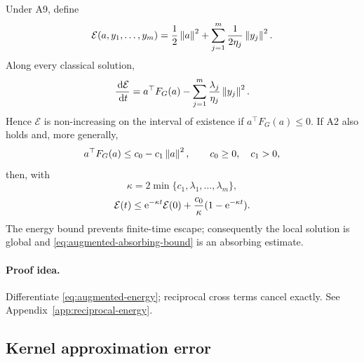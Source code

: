 \label{thm:reciprocal-energy}
\begin{theoremsix}
Under A9, define
\begin{equation}
 \mathcal E(a,y_1,\ldots,y_m)
 =\frac12\left\lVert a\right\rVert^2+
 \sum_{j=1}^{m}\frac{1}{2\eta_j}\left\lVert y_j\right\rVert^2.
 \label{eq:augmented-energy}
\end{equation}
Along every classical solution,
\begin{equation}
 \frac{\,\mathrm{d}\mathcal E}{\,\mathrm{d} t}
 =a^\top F_G(a)
 -\sum_{j=1}^{m}\frac{\lambda_j}{\eta_j}\left\lVert y_j\right\rVert^2.
 \label{eq:reciprocal-energy-identity}
\end{equation}
Hence $\mathcal E$ is non-increasing on the interval of existence if
$a^\top F_G(a)\le0$. If A2 also holds and, more generally,
\begin{equation}
 a^\top F_G(a)\le c_0-c_1\left\lVert a\right\rVert^2,
 \qquad c_0\ge0,\quad c_1>0,
 \label{eq:galerkin-absorbing}
\end{equation}
then, with
\begin{equation}
 \kappa=2\min\{c_1,\lambda_1,\ldots,\lambda_m\},
 \label{eq:kappa}
\end{equation}
\begin{equation}
 \mathcal E(t)
 \le
 \mathrm{e}^{-\kappa t}\mathcal E(0)
 +\frac{c_0}{\kappa}(1-\mathrm{e}^{-\kappa t}).
 \label{eq:augmented-absorbing-bound}
\end{equation}
The energy bound prevents finite-time escape; consequently the local
solution is global and \eqref{eq:augmented-absorbing-bound} is an absorbing
estimate.
\end{theoremsix}

\paragraph{Proof idea.}
Differentiate \eqref{eq:augmented-energy}; reciprocal cross terms cancel
exactly. See Appendix~\ref{app:reciprocal-energy}.

\subsection{Kernel approximation error}
\label{sec:kernel-error}

